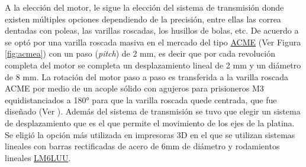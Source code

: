 A la elección del motor, le sigue la elección del sistema de transmisión donde existen múltiples opciones dependiendo de la precisión, entre ellas las correa dentadas con poleas, las varillas roscadas, los husillos de bolas, etc. De acuerdo a \cite{schaa} se optó por una varilla roscada masiva en el mercado del tipo \href{https://www.mcmaster.com/acme-screws/acme-lead-screws-and-nuts/}{ACME} (Ver Figura \ref{fig:acmea}) con un paso (\textit{pitch}) de 2 mm, es decir que por cada revolución completa del motor se completa un desplazamiento lineal de 2 mm y un diámetro de 8 mm. La rotación del motor paso a paso es transferida a la varilla roscada ACME por medio de un acople sólido con agujeros para prisioneros M3 equidistanciados a 180° para que la varilla roscada quede centrada, que fue diseñado (Ver \href{https://github.com/jrr1984/open_frame_XYStage/blob/master/3dprintedparts/acopleRIGIDO.STL}{\faCubes}). Además del sistema de transmisión se tuvo que elegir un sistema de desplazamiento que es el que permite el movimiento de los ejes de la platina. Se eligió la opción más utilizada en impresoras 3D en el que se utilizan sistemas lineales con barras rectificadas de acero de 6mm de diámetro y rodamientos lineales \href{https://uk.misumi-ec.com/vona2/detail/221000091678/?HissuCode=LM6LUU}{LM6LUU}.

\begin{figure}[H]
	\begin{floatrow}
	\end{floatrow}
\end{figure}

